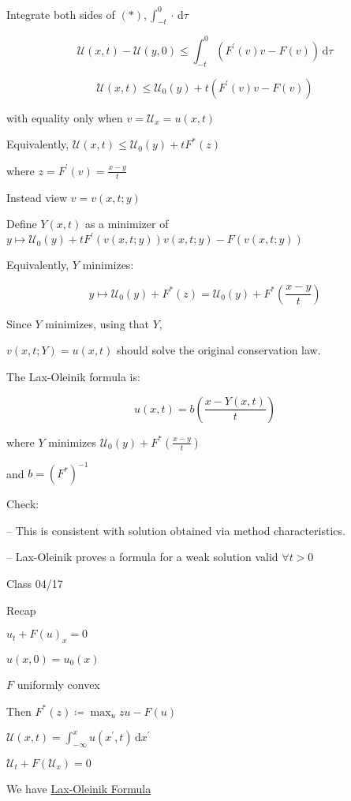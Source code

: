 \documentclass{article}
\theoremstyle{definition}
\begin{document}
Integrate both sides of \((\ast), \int_{-t}^{0} \cdot \,\mathrm{d}\tau \) 

\[
    \mathcal{U}(x,t) - \mathcal{U}(y,0) \leq \int_{-t}^{0} (F^{\prime}(v)v - F(v)) \,\mathrm{d}\tau 
\]

\[
    \mathcal{U}(x,t) \leq \mathcal{U}_0(y) + t (F^{\prime} (v) v - F(v))
\]

with equality only when \(v = \mathcal{U}_x = u(x,t)\) 

Equivalently, \(\mathcal{U}(x,t) \leq \mathcal{U}_0(y) + t F^{\ast} (z)\) 

where \(z = F^{\prime} (v) = \frac{x-y}{t}\) 

Instead view \(v = v(x,t;y)\) 

Define \(Y(x,t)\) as a minimizer of \(y \mapsto \mathcal{U}_0(y)+t F^{\prime} (v(x,t;y))v(x,t;y)-F(v(x,t;y))\)

Equivalently, \(Y\) minimizes:

\[
    y \mapsto \mathcal{U}_0(y) + F^{\ast} (z) = \mathcal{U}_0(y) + F^{\ast}\left(\frac{x-y}{t}\right)
\]

Since \(Y\) minimizes, using that \(Y\),

\(v(x,t;Y)=u(x,t)\) should solve the original conservation law.

The Lax-Oleinik formula is:

\[
    u(x,t)=b \left( \frac{x-Y(x,t)}{t} \right) 
\]

where \(Y\) minimizes \(\mathcal{U}_0(y)+F^{\ast} \left( \frac{x-y}{t} \right) \) 

and \(b = (F^{\ast})^{-1} \) 

Check:

-- This is consistent with solution obtained via method characteristics.

-- Lax-Oleinik proves a formula for a weak solution valid \(\forall t > 0\)

\hrulefill

Class 04/17

Recap

\(u_t + F(u)_x = 0\) 

\(u(x,0)=u_0(x)\) 

\(F\) uniformly convex

Then \(F^{\ast} (z)\coloneqq \max_u zu - F(u)\)

\(\mathcal{U}(x,t)= \int_{-\infty}^{x} u(x^{\prime} , t) \,\mathrm{d}x^{\prime}  \) 

\(\mathcal{U}_t + F(\mathcal{U}_x) = 0\) 

We have \underline{Lax-Oleinik Formula} 
\end{document}
